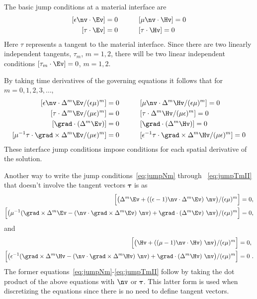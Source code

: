 \documentclass[11pt]{article}
\newcommand{\Div}{\grad\cdot}
\newcommand{\tauv}{\boldsymbol{\tau}}
\newcommand{\curl}{\grad\times}
\begin{document}
The basic jump conditions at a material interface are 
\begin{alignat}{3}
  [ \epsilon \nv\cdot\Ev] & =0 &\qquad& [\mu \nv\cdot\Hv] =0   \label{eq:jumpN0}\\
  [ \tau\cdot \Ev] &=0         &\qquad& [ \tau\cdot\Hv ] =0    \label{eq:jumpT0}
\end{alignat}
Here $\tau$ represents a tangent to the material interface. Since there are two linearly independent
tangents, $\tau_m$, $m=1,2$, there will be two linear independent conditions
$[\tau_m\cdot \Ev]=0$, $m=1,2$.

By taking time derivatives of the governing equations it follows that for $m=0,1,2,3,\ldots$, 
\begin{alignat}{3}
  [ \epsilon\nv\cdot\Delta^m \Ev/(\epsilon\mu)^m] & =0  
          &\qquad& [\mu \nv\cdot\Delta^m\Hv/(\epsilon\mu)^m] =0 \label{eq:jumpNm}\\
  [ \tau\cdot\Delta^m \Ev/(\mu\epsilon)^m] &=0 
          &\qquad& [ \tau\cdot\Delta^m\Hv/(\mu\epsilon)^m ] =0    \label{eq:jumpTm} \\
  [ \Div(\Delta^m\Ev)] & =0               &\qquad& [\Div(\Delta^m\Hv)] =0  \\
  [ \mu^{-1}\tau\cdot\curl\Delta^m\Ev/(\mu\epsilon)^m] &=0    
          &\qquad& [ \epsilon^{-1}\tau\cdot\curl\Delta^m\Hv/(\mu\epsilon)^m ] =0  \label{eq:jumpTmII}
\end{alignat}
These interface jump conditions impose conditions for each spatial derivative of the solution.

Another way to write the jump conditions~\eqref{eq:jumpNm} through ~\eqref{eq:jumpTmII} that
doesn't involve the tangent vectors $\tauv$ is as 
\begin{align}
  \Big[ \big(\Delta^m \Ev  + ( (\epsilon-1) \nv\cdot\Delta^m\Ev )~\nv\big)/(\epsilon\mu)^m \Big] &=0, \\
  \Big[ \big(\mu^{-1}(\curl\Delta^m\Ev - (\nv\cdot \curl\Delta^m\Ev)~\nv)
             + \Div(\Delta^m\Ev)~\nv  \big)/(\epsilon\mu)^m \Big] &=0,
\end{align}
and 
\begin{align}
  \Big[ \big(\Hv  + ( (\mu-1) \nv\cdot\Hv )~\nv\big)/(\epsilon\mu)^m \Big] &=0 , \\
  \Big[ \big(\epsilon^{-1}(\curl\Delta^m\Hv - (\nv\cdot \curl\Delta^m\Hv)~\nv )
             + \Div(\Delta^m\Hv)~\nv  \big)/(\epsilon\mu)^m \Big] &=0 ~.
\end{align}
The former equations~\eqref{eq:jumpNm}-\eqref{eq:jumpTmII} follow by taking the
dot product of the above equations with $\nv$ or $\tauv$.  This latter form is 
used when discretizing the equations since there is no need to define
tangent vectors.
\end{document}
